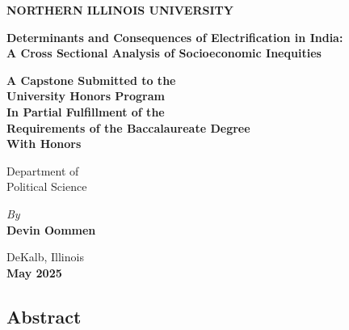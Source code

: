 \documentclass[
]{article}
\author{}
\date{}
\begin{document}
\ifdefined\Shaded\renewenvironment{Shaded}{\begin{tcolorbox}[breakable, boxrule=0pt, frame hidden, interior hidden, sharp corners, enhanced, borderline west={3pt}{0pt}{shadecolor}]}{\end{tcolorbox}}\fi


\newpage
\thispagestyle{empty}

\begin{center}
\vspace*{3cm} %

{\LARGE \textbf{NORTHERN ILLINOIS UNIVERSITY}}

\vspace{1cm} %

{\Large \textbf{Determinants and Consequences of Electrification in India:}} \\
{\Large \textbf{A Cross Sectional Analysis of Socioeconomic Inequities}}

\vspace{1cm} %

\textbf{A Capstone Submitted to the} \\ 
\textbf{University Honors Program} \\
\textbf{In Partial Fulfillment of the} \\
\textbf{Requirements of the Baccalaureate Degree} \\
\textbf{With Honors}

\vspace{1cm} %

{\large Department of} \\
{\large Political Science}

\vspace{1cm} %

\textit{By} \\ 
{\large \textbf{Devin Oommen}}

\vspace{1cm} %

{\large DeKalb, Illinois} \\
\textbf{May 2025}
\end{center}

\newpage

\hypertarget{abstract}{%
\subsection{Abstract}\label{abstract}}
\end{document}
